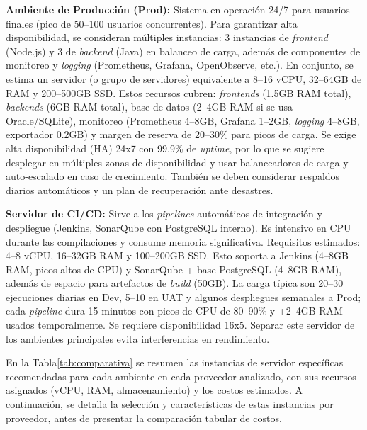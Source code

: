 \documentclass[12pt]{article}
\begin{document}
\textbf{Ambiente de Producción (Prod):} Sistema en operación 24/7 para usuarios finales (pico de 50--100 usuarios concurrentes). Para garantizar alta disponibilidad, se consideran múltiples instancias: 3 instancias de \emph{frontend} (Node.js) y 3 de \emph{backend} (Java) en balanceo de carga, además de componentes de monitoreo y \emph{logging} (Prometheus, Grafana, OpenObserve, etc.). En conjunto, se estima un servidor (o grupo de servidores) equivalente a 8--16 vCPU, 32--64GB de RAM y 200--500GB SSD. Estos recursos cubren: \emph{frontends} (1.5GB RAM total), \emph{backends} (6GB RAM total), base de datos (2--4GB RAM si se usa Oracle/SQLite), monitoreo (Prometheus 4--8GB, Grafana 1--2GB, \emph{logging} 4--8GB, exportador 0.2GB) y margen de reserva de 20--30\% para picos de carga. Se exige alta disponibilidad (HA) 24x7 con 99.9\% de \emph{uptime}, por lo que se sugiere desplegar en múltiples zonas de disponibilidad y usar balanceadores de carga y auto-escalado en caso de crecimiento. También se deben considerar respaldos diarios automáticos y un plan de recuperación ante desastres.

\textbf{Servidor de CI/CD:} Sirve a los \emph{pipelines} automáticos de integración y despliegue (Jenkins, SonarQube con PostgreSQL interno). Es intensivo en CPU durante las compilaciones y consume memoria significativa. Requisitos estimados: 4--8 vCPU, 16--32GB RAM y 100--200GB SSD. Esto soporta a Jenkins (4--8GB RAM, picos altos de CPU) y SonarQube + base PostgreSQL (4--8GB RAM), además de espacio para artefactos de \emph{build} (50GB). La carga típica son 20--30 ejecuciones diarias en Dev, 5--10 en UAT y algunos despliegues semanales a Prod; cada \emph{pipeline} dura 15 minutos con picos de CPU de 80--90\% y +2--4GB RAM usados temporalmente. Se requiere disponibilidad 16x5. Separar este servidor de los ambientes principales evita interferencias en rendimiento.

En la Tabla\ref{tab:comparativa} se resumen las instancias de servidor específicas recomendadas para cada ambiente en cada proveedor analizado, con sus recursos asignados (vCPU, RAM, almacenamiento) y los costos estimados. A continuación, se detalla la selección y características de estas instancias por proveedor, antes de presentar la comparación tabular de costos.
\end{document}
